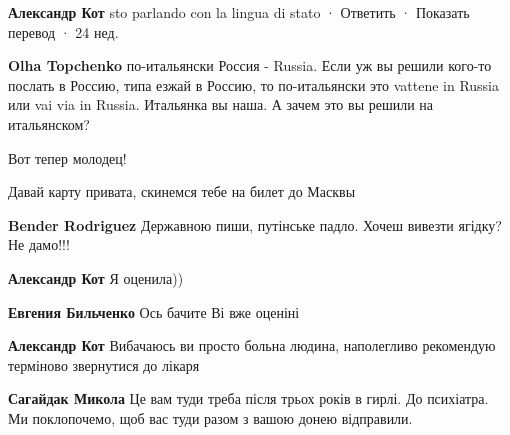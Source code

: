 \begin{itemize}
\begin{itemize}

\textbf{Александр Кот} sto parlando con la lingua di stato
 · Ответить · Показать перевод · 24 нед.

\textbf{Olha Topchenko} по-итальянски Россия - Russia. Если уж вы решили кого-то послать в Россию, типа езжай в Россию, то по-итальянски это vattene in Russia или vai via in Russia. Итальянка вы наша. А зачем это вы решили на итальянском?
\end{itemize}


Вот тепер молодец!


Давай карту привата, скинемся тебе на билет до Масквы \Smiley[1.0][yellow]

\begin{itemize}

\textbf{Bender Rodriguez} Державною пиши, путінське падло. Хочеш вивезти ягідку? Не дамо!!!


\textbf{Александр Кот} Я оценила))


\textbf{Евгения Бильченко} Ось бачите Ві вже оценіні🤣


\textbf{Александр Кот} Вибачаюсь ви просто больна людина, наполегливо рекомендую терміново звернутися до лікаря


\textbf{Сагайдак Микола} Це вам туди треба після трьох років в гирлі. До психіатра. Ми поклопочемо, щоб вас туди разом з вашою донею відправили.


\end{itemize}
\end{itemize}
